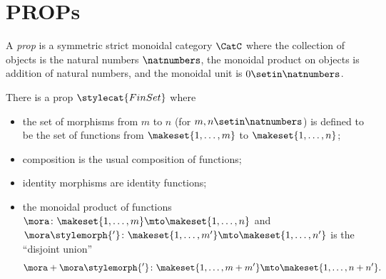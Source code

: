 
\section{PROPs}
\label{sec:props}


\begin{ctdefinition}\label{def:prop}
    A \emph{prop} is a symmetric strict monoidal category $\CatC$ where the collection of objects is the natural numbers $\natnumbers$, the monoidal product on objects is addition of natural numbers, and the monoidal unit is $0 \setin \natnumbers$.
\end{ctdefinition}

\begin{example}\label{exa:prop-finset}
    There is a prop $\stylecat{FinSet}$ where
    \begin{itemize}
        \item the set of morphisms from $m$ to $n$ (for $m, n \setin \natnumbers$) is defined to be the set of functions from $\makeset{1, \dots, m}$ to $\makeset{1, \dots, n}$;
        \item composition is the usual composition of functions;
        \item identity morphisms are identity functions;
        \item the monoidal product of functions $\mora \colon \makeset{1, \dots, m} \mto \makeset{1, \dots, n}$ and $\mora\stylemorph{'} \colon \makeset{1, \dots, m'} \mto \makeset{1, \dots, n'}$ is the ``disjoint union''
              \begin{equation}
                  \mora + \mora\stylemorph{'} \colon \makeset{1, \dots, m + m'} \mto \makeset{1, \dots, n + n'}.
              \end{equation}
    \end{itemize}
\end{example}

